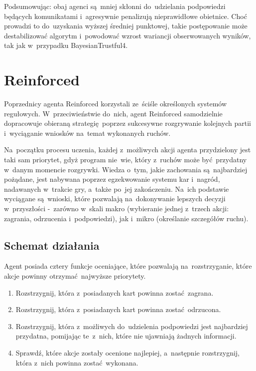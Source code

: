 \documentclass[declaration,shortabstract,inz]{iithesis}
\begin{document}
Podsumowując: obaj agenci są~mniej skłonni do~udzielania podpowiedzi będących komunikatami i~agresywnie penalizują nieprawidłowe obietnice. Choć prowadzi to do~uzyskania wyższej średniej punktowej, takie postępowanie może destabilizować algorytm i~powodować wzrost wariancji obserwowanych wyników, tak jak w~przypadku BayesianTrustful4.

\section{Reinforced}

Poprzednicy agenta Reinforced korzystali ze~ściśle określonych systemów regułowych. W~przeciwieństwie do~nich, agent Reinforced samodzielnie dopracowuje obieraną strategię poprzez sukcesywne rozgrywanie kolejnych partii i~wyciąganie wniosków na~temat wykonanych ruchów.

Na~początku procesu uczenia, każdej z~możliwych akcji agenta przydzielony jest taki sam priorytet, gdyż program nie~wie, który z~ruchów może być przydatny w~danym momencie rozgrywki. Wiedza o~tym, jakie zachowania są~najbardziej pożądane, jest nabywana poprzez egzekwowanie systemu kar i~nagród, nadawanych w~trakcie gry, a~także po~jej zakończeniu. Na~ich podstawie wyciągane są~wnioski, które pozwalają na~dokonywanie lepszych decyzji w~przyszłości -~zarówno w~skali makro (wybieranie jednej z~trzech akcji: zagrania, odrzucenia i~podpowiedzi), jak i~mikro (określanie szczegółów ruchu).

\subsection*{Schemat działania}

Agent posiada cztery funkcje oceniające, które pozwalają na~rozstrzyganie, które akcje powinny otrzymać najwyższe priorytety.

\begin{enumerate}
	\item Rozstrzygnij, która z~posiadanych kart powinna zostać zagrana.
	\item Rozstrzygnij, która z~posiadanych kart powinna zostać odrzucona.
	\item Rozstrzygnij, która z~możliwych do~udzielenia podpowiedzi jest najbardziej przydatna, pomijając te~z~nich, które nie ujawniają żadnych informacji.
	\item Sprawdź, które akcje zostały ocenione najlepiej, a~następnie rozstrzygnij, która z~nich powinna zostać wykonana.
\end{enumerate}
\end{document}
